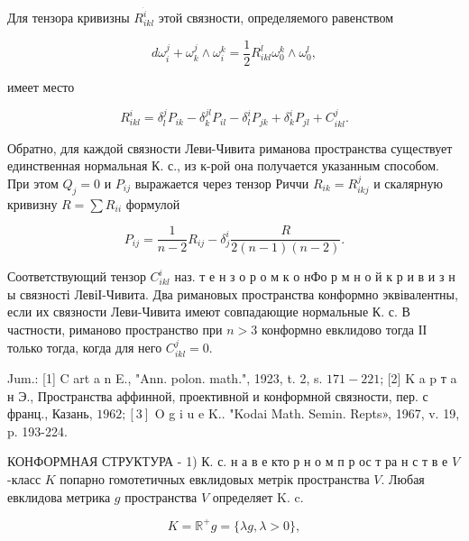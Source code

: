 \documentclass[10pt]{article}
\begin{document}
Для тензора кривизны $R_{i k l}^{\dot{i}}$ этой связности, определяемого равенством



\[

d \omega_{i}^{j}+\omega_{k}^{j} \wedge \omega_{i}^{k}=\frac{1}{2} R_{i k l}^{\dot{l}} \omega_{0}^{k} \wedge \omega_{0}^{l},

\]



имеет место



\[

R_{i k l}^{i}=\delta_{l}^{j} P_{i k}-\delta_{k}^{j l} P_{i l}-\delta_{l}^{i} P_{j k}+\delta_{k}^{i} P_{j l}+C_{i k l}^{j} .

\]



Обратно, для каждой связности Леви-Чивита риманова пространства существует единственная нормальная К. с., из к-рой она получается указанным способом. При этом $Q_{j}=0$ и $P_{i j}$ выражается через тензор Риччи $R_{i k}=R_{i k j}^{j}$ и скалярную кривизну $R=\sum R_{i i}$ формулой



\[

P_{i j}=\frac{1}{n-2} R_{i j}-\delta_{j}^{i} \frac{R}{2(n-1)(n-2)} .

\]



Соответствующий тензор $C_{i k l}^{i}$ наз. т е н з о р о м к о нФо р м н о й к р и в и з н ы связності ЛевіІ-Чивита. Два римановых пространства конформно эквівалентны, если их связности Леви-Чивита имеют совпадающие нормальные К. с. В частности, риманово пространство при $n>3$ конформно евклидово тогда ІІ только тогда, когда для него $C_{i k l}^{j}=0$.



Jum.: [1] C art a n E., "Ann. polon. math.", 1923, t. 2, s. $171-221$; [2] K a p т a н Э., Пространства аффинной, проективной и конформной связности, пер. с франц., Казань, $1962 ;[3]$ O g i u e K.. "Kodai Math. Semin. Repts», 1967, v. 19, p. 193-224.



КОНФОРМНАЯ СТРУКТУРА - 1) К. с. н а в е кто р н о м п р ос т ра н с т в е $V$-класс $K$ попарно гомотетичных евклидовых метрік пространства $V$. Любая евклидова метрика $g$ пространства $V$ определяет K. c.



\[

K=\mathbb{R}^{+} g=\{\lambda g, \lambda>0\},

\]
\end{document}
